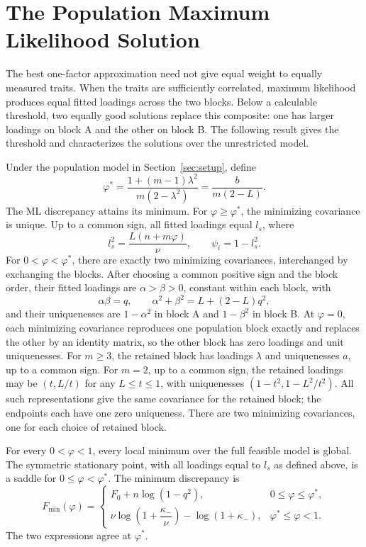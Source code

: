\section{The Population Maximum Likelihood Solution}
\label{sec:ml-classification}

The best one-factor approximation need not give equal weight to equally measured traits. When the traits are sufficiently correlated, maximum likelihood produces equal fitted loadings across the two blocks. Below a calculable threshold, two equally good solutions replace this composite: one has larger loadings on block A and the other on block B. The following result gives the threshold and characterizes the solutions over the unrestricted model.

\begin{theorem}
\label{thm:ml}
Under the population model in Section~\ref{sec:setup}, define
\begin{equation}
\varphi^*=\frac{1+(m-1)\lambda^2}{m(2-\lambda^2)}=\frac{b}{m(2-L)}.
\label{eq:ml-threshold}
\end{equation}
The ML discrepancy attains its minimum. For $\varphi\ge\varphi^*$, the minimizing covariance is unique. Up to a common sign, all fitted loadings equal $l_s$, where
\[
l_s^2=\frac{L(n+m\varphi)}{\nu },\qquad \psi_i=1-l_s^2.
\]
For $0<\varphi<\varphi^*$, there are exactly two minimizing covariances, interchanged by exchanging the blocks. After choosing a common positive sign and the block order, their fitted loadings are $\alpha>\beta>0$, constant within each block, with
\begin{equation}
\alpha\beta=q,\qquad
\alpha^2+\beta^2=L+(2-L)q^2,
\label{eq:ml-asymmetric-loadings}
\end{equation}
and their uniquenesses are $1-\alpha^2$ in block A and $1-\beta^2$ in block B.
At $\varphi=0$, each minimizing covariance reproduces one population block exactly and replaces the other by an identity matrix, so the other block has zero loadings and unit uniquenesses. For $m\ge3$, the retained block has loadings $\lambda$ and uniquenesses $a$, up to a common sign. For $m=2$, up to a common sign, the retained loadings may be $(t,L/t)$ for any $L\le t\le1$, with uniquenesses $(1-t^2,1-L^2/t^2)$. All such representations give the same covariance for the retained block; the endpoints each have one zero uniqueness. There are two minimizing covariances, one for each choice of retained block.

For every $0<\varphi<1$, every local minimum over the full feasible model is global. The symmetric stationary point, with all loadings equal to $l_s$ as defined above, is a saddle for $0\le\varphi<\varphi^*$. The minimum discrepancy is
\begin{equation}
F_{\min}(\varphi)=
\begin{cases}
F_0+n\log(1-q^2),&0\le\varphi\le\varphi^*,\\[3pt]
\nu \log\!\left(1+\dfrac{\kappa_-}{\nu }\right)-\log(1+\kappa_-),
&\varphi^*\le\varphi<1.
\end{cases}
\label{eq:ml-minimum}
\end{equation}
The two expressions agree at $\varphi^*$.
\end{theorem}

